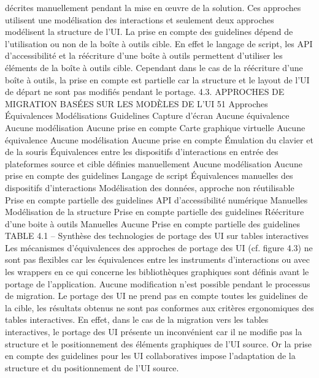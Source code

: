\documentclass{article}
\begin{document}
d\'{e}crites manuellement pendant la mise en œuvre de la solution. Ces approches utilisent une mod\'{e}lisation des interactions et seulement deux approches mod\'{e}lisent la structure de l’UI. La prise en compte
des guidelines d\'{e}pend de l’utilisation ou non de la bo\^{i}te \`{a} outils cible. En effet le langage de script, les
API d’accessibilit\'{e} et la r\'{e}\'{e}criture d’une bo\^{i}te \`{a} outils permettent d’utiliser les \'{e}l\'{e}ments de la bo\^{i}te \`{a}
outils cible. Cependant dans le cas de la r\'{e}\'{e}criture d’une bo\^{i}te \`{a} outils, la prise en compte est partielle
car la structure et le layout de l’UI de d\'{e}part ne sont pas modiﬁ\'{e}s pendant le portage.
4.3. APPROCHES DE MIGRATION BASÉES SUR LES MODÈLES DE L’UI
51
Approches
Équivalences
Mod\'{e}lisations
Guidelines
Capture d’\'{e}cran
Aucune \'{e}quivalence
Aucune mod\'{e}lisation
Aucune prise en
compte
Carte graphique
virtuelle
Aucune \'{e}quivalence
Aucune mod\'{e}lisation
Aucune prise en
compte
Émulation du clavier
et de la souris
Équivalences entre les
dispositifs
d’interactions en entr\'{e}e
des plateformes source
et cible d\'{e}ﬁnies
manuellement
Aucune mod\'{e}lisation
Aucune prise en
compte des guidelines
Langage de script
Équivalences
manuelles des
dispositifs
d’interactions
Mod\'{e}lisation des
donn\'{e}es, approche non
r\'{e}utilisable
Prise en compte
partielle des guidelines
API d’accessibilit\'{e}
num\'{e}rique
Manuelles
Mod\'{e}lisation de la
structure
Prise en compte
partielle des guidelines
R\'{e}\'{e}criture d’une
boite \`{a} outils
Manuelles
Aucune
Prise en compte
partielle des guidelines
TABLE 4.1 – Synth\`{e}se des technologies de portage des UI sur tables interactives
Les m\'{e}canismes d’\'{e}quivalences des approches de portage des UI (cf. ﬁgure 4.3) ne sont pas
ﬂexibles car les \'{e}quivalences entre les instruments d’interactions ou avec les wrappers en ce qui
concerne les biblioth\`{e}ques graphiques sont d\'{e}ﬁnis avant le portage de l’application. Aucune modiﬁcation n’est possible pendant le processus de migration.
Le portage des UI ne prend pas en compte toutes les guidelines de la cible, les r\'{e}sultats obtenus
ne sont pas conformes aux crit\`{e}res ergonomiques des tables interactives. En effet, dans le cas de la
migration vers les tables interactives, le portage des UI pr\'{e}sente un inconv\'{e}nient car il ne modiﬁe pas
la structure et le positionnement des \'{e}l\'{e}ments graphiques de l’UI source. Or la prise en compte des
guidelines pour les UI collaboratives impose l’adaptation de la structure et du positionnement de l’UI
source.
\end{document}
